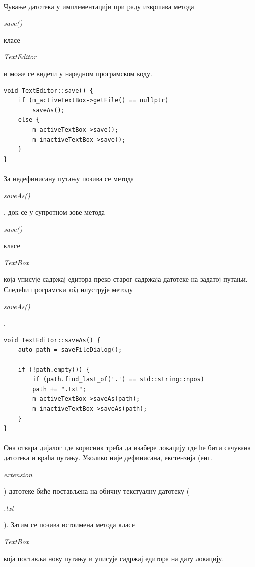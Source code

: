 \documentclass[12pt,oneside]{memoir}
\begin{document}
\paragraph{}
Чување датотека у имплементацији при раду извршава метода
\begin{latinica}\textit{save()}\end{latinica} класе
\begin{latinica}\textit{TextEditor}\end{latinica} и може се видети у наредном
програмском коду.

\begin{verbatim}
void TextEditor::save() {
	if (m_activeTextBox->getFile() == nullptr)
		saveAs();
	else {
		m_activeTextBox->save();
		m_inactiveTextBox->save();
	}
}
\end{verbatim}

\paragraph{}
За недефинисану путању позива се метода
\begin{latinica}\textit{saveAs()}\end{latinica}, док се у супротном
зове метода \begin{latinica}\textit{save()}\end{latinica} класе
\begin{latinica}\textit{TextBox}\end{latinica} која уписује садржај
едитора преко старог садржаја датотеке на задатој путањи. Следећи програмски к\^{о}д
илуструје методу \begin{latinica}\textit{saveAs()}\end{latinica}.

\begin{verbatim}
void TextEditor::saveAs() {
	auto path = saveFileDialog();
	
	if (!path.empty()) {
		if (path.find_last_of('.') == std::string::npos)
		path += ".txt";
		m_activeTextBox->saveAs(path);
		m_inactiveTextBox->saveAs(path);
	}
}
\end{verbatim}

\paragraph{}
Она отвара дијалог где корисник треба да изабере локацију где ће бити сачувана
датотека и враћа путању. Уколико није дефинисана, екстензија 
(енг. \begin{latinica}\textit{extension}\end{latinica}) датотеке биће
постављена на обичну текстуалну датотеку (\begin{latinica}\textit{.txt}\end{latinica}).
Затим се позива истоимена метода класе \begin{latinica}\textit{TextBox}\end{latinica} која
поставља нову путању и уписује садржај едитора на дату локацију.
\end{document}
